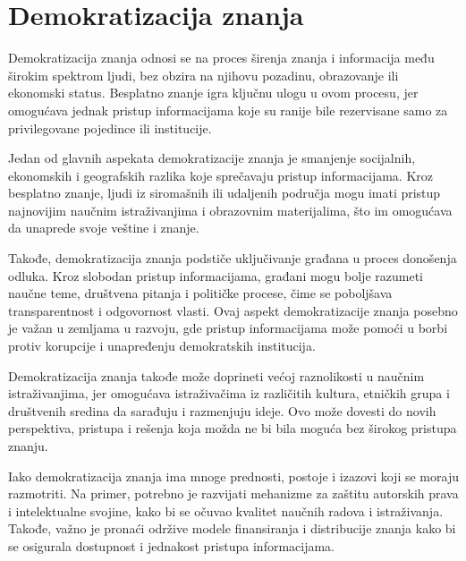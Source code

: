 \documentclass[a4paper]{article}
\begin{document}
{\setlength{\parskip}{2em}


\section{Demokratizacija znanja}
\label{Demokratizacija znanja}

Demokratizacija znanja odnosi se na proces širenja znanja i informacija među širokim spektrom ljudi, bez obzira na njihovu pozadinu, obrazovanje ili ekonomski status. Besplatno znanje igra ključnu ulogu u ovom procesu, jer omogućava jednak pristup informacijama koje su ranije bile rezervisane samo za privilegovane pojedince ili institucije.

Jedan od glavnih aspekata demokratizacije znanja je smanjenje socijalnih, ekonomskih i geografskih razlika koje sprečavaju pristup informacijama. Kroz besplatno znanje, ljudi iz siromašnih ili udaljenih područja mogu imati pristup najnovijim naučnim istraživanjima i obrazovnim materijalima, što im omogućava da unaprede svoje veštine i znanje.

Takođe, demokratizacija znanja podstiče uključivanje građana u proces donošenja odluka. Kroz slobodan pristup informacijama, građani mogu bolje razumeti naučne teme, društvena pitanja i političke procese, čime se poboljšava transparentnost i odgovornost vlasti. Ovaj aspekt demokratizacije znanja posebno je važan u zemljama u razvoju, gde pristup informacijama može pomoći u borbi protiv korupcije i unapređenju demokratskih institucija.

Demokratizacija znanja takođe može doprineti većoj raznolikosti u naučnim istraživanjima, jer omogućava istraživačima iz različitih kultura, etničkih grupa i društvenih sredina da sarađuju i razmenjuju ideje.\cite{peta} Ovo može dovesti do novih perspektiva, pristupa i rešenja koja možda ne bi bila moguća bez širokog pristupa znanju.

Iako demokratizacija znanja ima mnoge prednosti, postoje i izazovi koji se moraju razmotriti. Na primer, potrebno je razvijati mehanizme za zaštitu autorskih prava i intelektualne svojine, kako bi se očuvao kvalitet naučnih radova i istraživanja. Takođe, važno je pronaći održive modele finansiranja i distribucije znanja kako bi se osigurala dostupnost i jednakost pristupa informacijama.




\begin{verbatim}

\end{verbatim}

}
\end{document}
